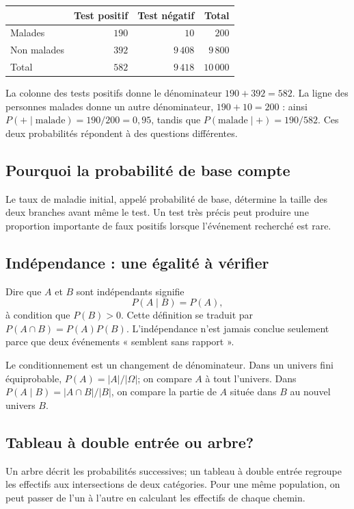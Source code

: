 \begin{center}
\begin{tabular}{lrrr}
\toprule
 & Test positif & Test négatif & Total\\
\midrule
Malades & $190$ & $10$ & $200$\\
Non malades & $392$ & $9\,408$ & $9\,800$\\
\midrule
Total & $582$ & $9\,418$ & $10\,000$\\
\bottomrule
\end{tabular}
\end{center}

La colonne des tests positifs donne le dénominateur $190+392=582$. La ligne des personnes malades donne un autre dénominateur, $190+10=200$ : ainsi $P(+\mid\text{malade})=190/200=0{,}95$, tandis que $P(\text{malade}\mid+)=190/582$. Ces deux probabilités répondent à des questions différentes.

\subsection{Pourquoi la probabilité de base compte}
Le taux de maladie initial, appelé probabilité de base, détermine la taille des deux branches avant même le test. Un test très précis peut produire une proportion importante de faux positifs lorsque l'événement recherché est rare.

\subsection{Indépendance : une égalité à vérifier}
Dire que $A$ et $B$ sont indépendants signifie
\[
P(A\mid B)=P(A),
\]
à condition que $P(B)>0$. Cette définition se traduit par $P(A\cap B)=P(A)P(B)$. L'indépendance n'est jamais conclue seulement parce que deux événements « semblent sans rapport ».

\begin{connectionbox}
Le conditionnement est un changement de dénominateur. Dans un univers fini équiprobable, \(P(A)=|A|/|\Omega|\); on compare $A$ à tout l'univers. Dans $P(A\mid B)=|A\cap B|/|B|$, on compare la partie de $A$ située dans $B$ au nouvel univers $B$.
\end{connectionbox}



\subsection{Tableau à double entrée ou arbre?}
Un arbre décrit les probabilités successives; un tableau à double entrée regroupe les effectifs aux intersections de deux catégories. Pour une même population, on peut passer de l'un à l'autre en calculant les effectifs de chaque chemin.

